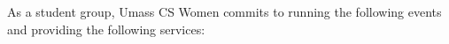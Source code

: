 As a student group, Umass CS Women commits to running the following events and providing the following services:



